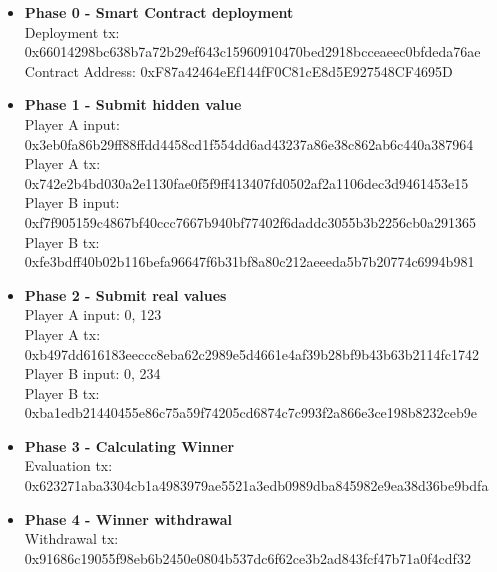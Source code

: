 \documentclass[12pt,a4paper]{article}
\begin{document}
\begin{itemize}
    \item \textbf{Phase 0 - Smart Contract deployment} \\
    
    Deployment tx: 0x66014298bc638b7a72b29ef643c15960910470bed2918bcceaeec0bfdeda76ae \\
    Contract Address: 0xF87a42464eEf144fF0C81cE8d5E927548CF4695D \\

    \item \textbf{Phase 1 - Submit hidden value} \\
    
    Player A input: 0x3eb0fa86b29ff88ffdd4458cd1f554dd6ad43237a86e38c862ab6c440a387964 \\
    Player A tx: 0x742e2b4bd030a2e1130fae0f5f9ff413407fd0502af2a1106dec3d9461453e15 \\

    Player B input: 0xf7f905159c4867bf40ccc7667b940bf77402f6daddc3055b3b2256cb0a291365 \\
    Player B tx: 0xfe3bdff40b02b116befa96647f6b31bf8a80c212aeeeda5b7b20774c6994b981 \\

    \item \textbf{Phase 2 - Submit real values} \\

    Player A input: 0, 123 \\
    Player A tx: 0xb497dd616183eeccc8eba62c2989e5d4661e4af39b28bf9b43b63b2114fc1742 \\

    Player B input: 0, 234 \\
    Player B tx: 0xba1edb21440455e86c75a59f74205cd6874c7c993f2a866e3ce198b8232ceb9e \\

    \item \textbf{Phase 3 - Calculating Winner} \\
    
    Evaluation tx: 0x623271aba3304cb1a4983979ae5521a3edb0989dba845982e9ea38d36be9bdfa\\

    \item \textbf{Phase 4 - Winner withdrawal} \\
    
    Withdrawal tx: 0x91686c19055f98eb6b2450e0804b537dc6f62ce3b2ad843fcf47b71a0f4cdf32 \\
\end{itemize}
\end{document}
